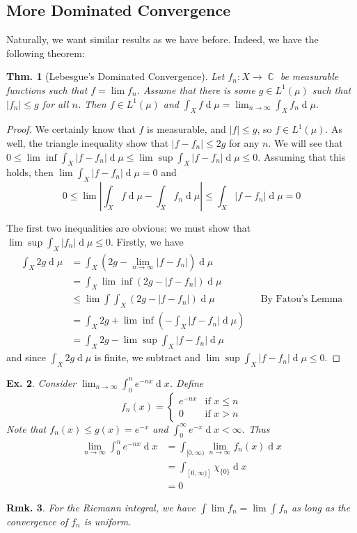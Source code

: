 \documentclass[12pt, a4paper]{book}
\DeclareMathOperator{\C}{\mathbb{C}}
\renewcommand{\d}[1]{\ensuremath{\operatorname{d}\!{#1}}} %
\newtheorem{theorem}{Thm.}[section]
\newtheorem{remark}[theorem]{Rmk.}
\newtheorem{example}[theorem]{Ex.}
\theoremstyle{nonumberplain}
\newtheorem{proof}{Proof}
\begin{document}
\subsection{More Dominated Convergence}
Naturally, we want similar results as we have before.
Indeed, we have the following theorem:
\begin{theorem}[Lebesgue's Dominated Convergence]
    Let $f_n:X\to\C$ be measurable functions such that $f=\lim f_n$.
    Assume that there is some $g\in L^1(\mu)$ such that $|f_n|\leq g$ for all $n$.
    Then $f\in L^1(\mu)$ and $\int_X f\d{\mu}=\lim_{n\to\infty}\int_X f_n\d{\mu}$.
\end{theorem}
\begin{proof}
    We certainly know that $f$ is measurable, and $|f|\leq g$, so $f\in L^1(\mu)$.
    As well, the triangle inequality show that $|f-f_n|\leq 2g$ for any $n$.
    We will see that $0\leq \lim\inf\int_X|f-f_n|\d{\mu}\leq\lim\sup\int_X|f-f_n|\d{\mu}\leq 0$.
    Assuming that this holds, then $\lim\int_X|f-f_n|\d{\mu}=0$ and
    \[0\leq\lim\left\lvert\int_Xf\d{\mu}-\int_Xf_n\d{\mu}\right\rvert\leq\int_X|f-f_n|\d{\mu}=0\]

    The first two inequalities are obvious: we must show that $\lim\sup\int_X|f_n|\d{\mu}\leq 0$.
    Firstly, we have
    \begin{align*}
        \int_X 2g\d{\mu} &= \int_X \left(2g-\lim_{n\to\infty}|f-f_n|\right)\d{\mu}\\
                         &= \int_X\lim\inf(2g-|f-f_n|)\d{\mu}\\
                         &\leq \lim\int\int_X(2g-|f-f_n|)\d{\mu} &&\text{By Fatou's Lemma}\\
                         &= \int_X 2g+\lim\inf\left(-\int_X|f-f_n|\d{\mu}\right)\\
                         &= \int_X 2g-\lim\sup \int_X|f-f_n|\d{\mu}
    \end{align*}
    and since $\int_X 2g\d{\mu}$ is finite, we subtract and $\lim\sup\int_X|f-f_n|\d{\mu}\leq 0$.
\end{proof}
\begin{example}
    Consider $\lim_{n\to\infty}\int_0^n e^{-nx}\d{x}$.
    Define
    \[f_n(x)=
        \begin{cases}
            e^{-nx}&\text{if }x\leq n\\
            0 &\text{if }x>n
        \end{cases}
    \]
    Note that $f_n(x)\leq g(x)=e^{-x}$ and $\int_0^\infty e^{-x}\d{x}<\infty$.
    Thus
    \begin{align*}
        \lim_{n\to\infty}\int_0^n e^{-nx}\d{x} &= \int_{[0,\infty)}\lim_{n\to\infty}f_n(x)\d{x}\\
                                               &= \int_{[0,\infty)]}\chi_{\{0\}}\d{x}\\
                                               &= 0
    \end{align*}
\end{example}
\begin{remark}
    For the Riemann integral, we have $\int\lim f_n=\lim\int f_n$ as long as the convergence of $f_n$ is uniform.
\end{remark}
\end{document}
